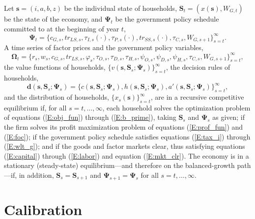 \documentclass[11pt,leqno,fleqn]{article}
\begin{document}
Let $\mathbf{s}=(i,a,b,z)$ be the individual state of households, $\mathbf{S}_{t}=(x(\mathbf{s}),W_{G,t})$ be the state of the economy, and $\mathbf{\Psi}_{t}$ be the government policy schedule committed to at the beginning of year $t$,
\begin{equation*}
	\mathbf{\Psi}_{t}=\bigl\{c_{G,s},tr_{LS,s},\tau_{I,s}(\cdot),
	\tau_{P,s}(\cdot),tr_{SS,s}(\cdot),\tau_{C,s},W_{G,s+1}
	\bigr\}_{s=t}^{\infty}.
\end{equation*}
A time series of factor prices and the government policy variables,
\begin{equation*}
	\mathbf{\Omega}_{t}=\bigl\{r_{s},w_{s},c_{G,s},tr_{LS,s},\varphi_{s},
	\tau_{O,s},\tau_{D,s},\tau_{H,s},\psi_{O,s},\psi_{D,s},\psi_{H,s},
	\tau_{C,s},W_{G,s+1}\bigr\}_{s=t}^{\infty},
\end{equation*}
the value functions of households, $\{v(\mathbf{s},\mathbf{S}_{s};\mathbf{\Psi}_{s})\}_{s=t}^{\infty}$, the decision rules of households,
\begin{equation*}
	\mathbf{d}(\mathbf{s},\mathbf{S}_{s};\mathbf{\Psi}_{s})=
	\bigl\{c(\mathbf{s},\mathbf{S}_{s};\mathbf{\Psi}_{s}),
	h(\mathbf{s},\mathbf{S}_{s};\mathbf{\Psi}_{s}),
	a'(\mathbf{s},\mathbf{S}_{s};\mathbf{\Psi}_{s})
	\bigr\}_{s=t}^{\infty},
\end{equation*}
and the distribution of households, $\{x_{s}(\mathbf{s})\}_{s=t}^{\infty}$, are in a recursive competitive equilibrium if, for all $s=t,\ldots,\infty$, each household solves the optimization problem of equations (\ref{E:obj_fun}) through (\ref{E:b_prime}), taking $\mathbf{S}_{s}$ and $\mathbf{\Psi}_{s}$ as given; if the firm solves its profit maximization problem of equations (\ref{E:prof_fun}) and (\ref{E:foc}); if the government policy schedule satisfies equations (\ref{E:tax_i}) through (\ref{E:wlt_g}); and if the goods and factor markets clear, thus satisfying equations (\ref{E:capital}) through (\ref{E:labor}) and equation (\ref{E:mkt_clr}). The economy is in a stationary (steady-state) equilibrium---and therefore on the balanced-growth path---if, in addition, $\mathbf{S}_{s}=\mathbf{S}_{s+1}$ and $\mathbf{\Psi}_{s+1}=\mathbf{\Psi}_{s}$ for all $s=t,\ldots,\infty$.








\section{Calibration}\label{Section: Calibration}
\end{document}
